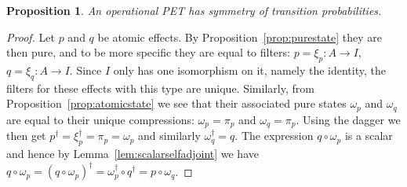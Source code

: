 \documentclass[b5paper,onecolumn,12pt,accepted=2019-05-03, issue=1, volume=1, shorttitle=papers/compositionality-1-1]{compositionalityarticle}
\newcounter{counter}
\numberwithin{counter}{section}
\newtheorem{proposition}[counter]{Proposition}
\begin{document}
\begin{proposition}\label{prop:symoftrans}
    An operational PET has symmetry of transition probabilities.
\end{proposition}
\begin{proof}
    Let $p$ and $q$ be atomic effects. By Proposition~\ref{prop:purestate} they are then pure, and to be more specific they are equal to filters: $p=\xi_p:A\rightarrow I$, $q=\xi_q:A\rightarrow I$. Since $I$ only has one isomorphism on it, namely the identity, the filters for these effects with this type are unique. Similarly, from Proposition~\ref{prop:atomicstate} we see that their associated pure states $\omega_p$ and $\omega_q$ are equal to their unique compressions: $\omega_p = \pi_p$ and $\omega_q = \pi_p$. Using the dagger we then get $p^\dagger = \xi_p^\dagger = \pi_p = \omega_p$ and similarly $\omega_q^\dagger = q$.
    The expression $q\circ \omega_p$ is a scalar and hence by Lemma~\ref{lem:scalarselfadjoint} we have $q\circ \omega_p = (q\circ\omega_p)^\dagger = \omega_p^\dagger \circ q^\dagger = p\circ \omega_q$.
\end{proof}
\end{document}
